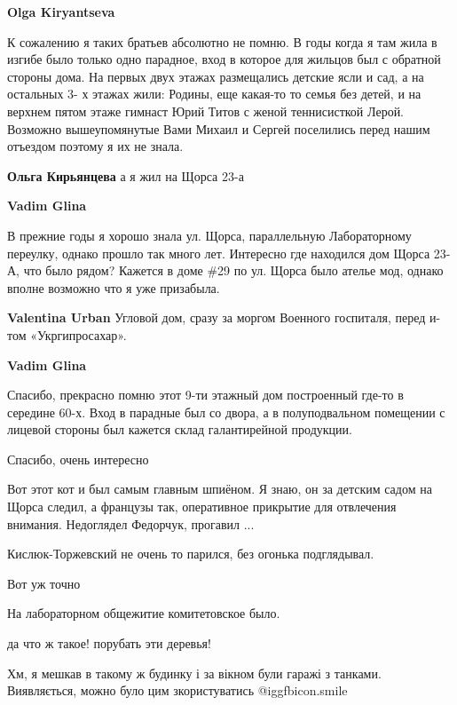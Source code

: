 \begin{itemize}
\begin{itemize}
\begin{itemize}
\textbf{Olga Kiryantseva} 

К сожалению я таких братьев абсолютно не помню. В годы когда я там жила в
изгибе было только одно парадное, вход в которое для жильцов был с обратной
стороны дома. На первых двух этажах размещались детские ясли и сад, а на
остальных 3- х этажах жили: Родины, еще какая-то то семья без детей, и на
верхнем пятом этаже гимнаст Юрий Титов с женой теннисисткой Лерой. Возможно
вышеупомянутые Вами Михаил и Сергей поселились перед нашим отъездом поэтому я
их не знала.


\textbf{Ольга Кирьянцева} а я жил на Щорса 23-а

\textbf{Vadim Glina} 

В прежние годы я хорошо знала ул. Щорса, параллельную Лабораторному переулку,
однако прошло так много лет. Интересно где находился дом Щорса 23-А, что было
рядом? Кажется в доме \#29 по ул. Щорса было ателье мод, однако вполне возможно
что я уже призабыла.

\textbf{Valentina Urban} Угловой дом, сразу за моргом Военного госпиталя, перед и-том «Укргипросахар».

\textbf{Vadim Glina} 

Спасибо, прекрасно помню этот 9-ти этажный дом построенный где-то в середине
60-х. Вход в парадные был со двора, а в полуподвальном помещении с лицевой
стороны был кажется склад галантирейной продукции.

\end{itemize} %

\end{itemize} %

Спасибо, очень интересно


Вот этот кот и был самым главным шпиёном. Я знаю, он за детским садом на Щорса
следил, а французы так, оперативное прикрытие для отвлечения внимания.
Недоглядел Федорчук, прогавил ...

Кислюк-Торжевский не очень то парился, без огонька подглядывал.

Вот уж точно

На лабораторном общежитие комитетовское было.

да что ж такое! порубать эти деревья!

Хм, я мешкав в такому ж будинку і за вікном були гаражі з танками.
Виявляється, можно було цим зкористуватись
 @igg{fbicon.smile} 


\end{itemize}
